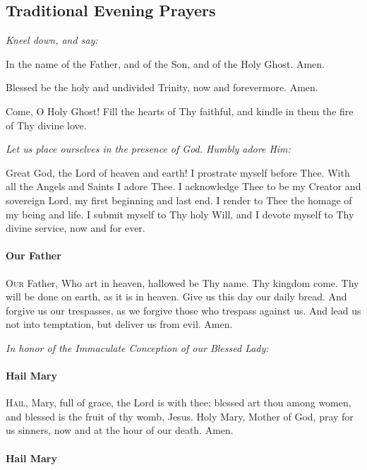 \documentclass{article}
\begin{document}
\begin{multicols}{3}

\section*{Traditional Evening Prayers}

\textit{Kneel down, and say:}

In the name of the Father, and of the Son, and of the Holy Ghost.  Amen.

Blessed be the holy and undivided Trinity, now and forevermore.  Amen.

Come, O Holy Ghost! Fill the hearts of Thy faithful, and kindle in them the fire
of Thy divine love.

\textit{Let us place ourselves in the presence of God.  Humbly adore Him:}

Great God, the Lord of heaven and earth!  I prostrate myself before Thee.
With all the Angels and Saints I adore Thee.  I acknowledge Thee to be my
Creator and sovereign Lord, my first beginning and last end.  I render to Thee
the homage of my being and life.  I submit myself to Thy holy Will, and I devote
myself to Thy divine service, now and for ever.

\paragraph{Our Father}

\textsc{Our} Father, Who art in heaven, hallowed be Thy name.
Thy kingdom come.  Thy will be done on earth, as it is in heaven.
Give us this day our daily bread.  And forgive us our trespasses,
as we forgive those who trespass against us.  And lead us not
into temptation, but deliver us from evil.  Amen.

\textit{In honor of the Immaculate Conception of our Blessed Lady:}

\paragraph{Hail Mary}

\textsc{Hail}, Mary, full of grace, the Lord is with thee;
blessed art thou among women, and blessed is the fruit of
thy womb, Jesus.  Holy Mary, Mother of God, pray for us sinners,
now and at the hour of our death. Amen.

\paragraph{Hail Mary}


\end{multicols}
\end{document}
